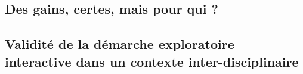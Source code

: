 \subsection{Des gains, certes, mais pour qui ?}
\subsection{Validité de la démarche exploratoire interactive dans un contexte inter-disciplinaire}


